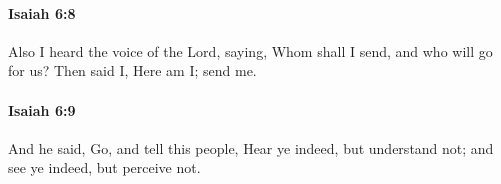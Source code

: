 		\paragraph{Isaiah 6:8} %
			\label{ISAIAH-6-8}

			Also I heard the voice of the Lord, saying, Whom shall I send, and who will go for us? Then said I, Here am I; send me.


		\paragraph{Isaiah 6:9} %
			\label{ISAIAH-6-9}

			And he said, Go, and tell this people, Hear ye indeed, but understand not; and see ye indeed, but perceive not.



